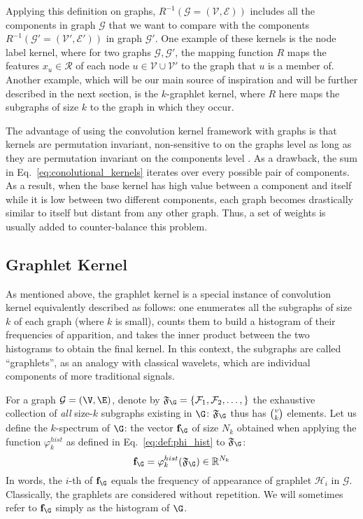 Applying this definition on graphs, $R^{-1}(\mathcal{G}=(\mathcal{V},\mathcal{E}))$ includes all the components in graph $\mathcal{G}$  that we want to compare with the components $R^{-1}(\mathcal{G'}=(\mathcal{V}',\mathcal{E}'))$ in graph $\mathcal{G'}$. One example of these kernels is the node label kernel, where for two graphs $\mathcal{G}, \mathcal{G'}$, the mapping function $R$ maps the features $x_u\in \mathcal{R}$ of each node $u\in \mathcal{V}\cup \mathcal{V'}$ to the graph that $u$ is a member of.  Another example, which will be our main source of inspiration and will be further described in the next section, is the $k$-graphlet kernel, where $R$ here maps the subgraphs of size $k$ to the graph in which they occur.

The advantage of using the convolution kernel framework with graphs is that kernels are permutation invariant, non-sensitive to  on the graphs level as long as they are permutation invariant on the components level . As a drawback, the sum in Eq.~\ref{eq:conolutional_kernels} iterates over every possible pair of components. As a result, when the base kernel has high value between a component and itself while it is low between two different components, each graph becomes drastically similar to itself but distant from any other graph. Thus, a set of weights is usually added to counter-balance this problem.

\subsection{Graphlet Kernel}
\label{subsection: graphlet kernel}

As mentioned above, the graphlet kernel is a special instance of convolution kernel equivalently described as follows: one enumerates all the subgraphs of size $k$ of each graph (where $k$ is small), counts them to build a histogram of their frequencies of apparition, and takes the inner product between the two histograms to obtain the final kernel. In this context, the subgraphs are called ``graphlets'', as an analogy with classical wavelets, which are individual components of more traditional signals.

For a graph $\mathcal{G}=(\V,\E)$, denote by $\mathfrak{F}_\G=\{\mathcal{F}_1,\mathcal{F}_2,\ldots,\}$ the exhaustive collection of \emph{all} size-$k$ subgraphs existing in $\G$: $\mathfrak{F}_\G$ thus has $\tbinom{v}{k}$ elements. Let us define the $k$-spectrum of $\G$: the vector $\mathbf{f}_\G$ of size $N_k$ obtained when applying the function $\varphi_k^{hist}$ as defined in Eq.~\eqref{eq:def:phi_hist} to  $\mathfrak{F}_\G$:
\[
\mathbf{f}_\G=\varphi_k^{hist}(\mathfrak{F}_\G) \in\mathbb{R}^{N_k}
\]
In words, the $i$-th of $\mathbf{f}_\G$ equals the frequency of appearance of graphlet $\mathcal{H}_i$ in $\mathcal{G}$. Classically, the graphlets are considered without repetition. We will sometimes refer to $\mathbf{f}_\G$ simply as the histogram of $\G$. 

